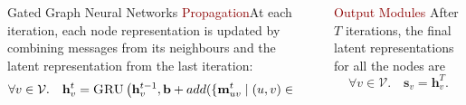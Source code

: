 \documentclass[final,hyperref={pdfpagelabels=false}]{beamer}
\newcommand{\shrink}{-15pt}
\begin{document}
\begin{frame}[t]
\begin{columns}[t]
\begin{column}{.3\textwidth}
\begin{block}{Gated Graph Neural Networks}
    \textcolor{darkred}{Propagation}\quad At each iteration, each node representation is updated by combining messages from its neighbours and the latent representation from the last iteration:
    \begin{equation}
        \forall v \in \mathcal{V}. \quad \mathbf{h}_v^t = \textsc{GRU}\left(\mathbf{h}_v^{t-1}, 
         \mathbf{b} + add(\{\mathbf{m}_{uv}^t \mid (u, v) \in \mathcal{E} \})\right).
    \end{equation}
    \end{block}
    
    
    
    
  \end{column} %


  \begin{column}{.02\textwidth}\end{column} %

  \begin{column}{.3\textwidth} %
    
    \color{oxfordblue}
    \textcolor{darkred}{Output Modules} After $T$ iterations, the final latent representations for all the nodes are
    \begin{equation}
        \forall v \in \mathcal{V}.\quad \mathbf{s}_v = \mathbf{h}_v^T.
    \end{equation}
    

\end{column}
\end{columns}
\end{frame}
\end{document}
